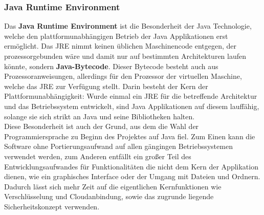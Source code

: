 \documentclass[13pt,a4paper,bibliography=totocnumbered,listof=totocnumbered]{scrartcl}
\begin{document}
\subsubsection{Java Runtime Environment}
Das \textbf{Java Runtime Environment} ist die Besonderheit der Java Technologie, welche den plattformunabhängigen Betrieb der Java Applikationen erst ermöglicht. Das  JRE nimmt keinen üblichen Maschinencode entgegen, der prozessorgebunden wäre und damit nur auf bestimmten Architekturen laufen könnte, sondern \textbf{Java-Bytecode}. Dieser Bytecode besteht auch aus Prozessoranweisungen, allerdings für den Prozessor der virtuellen Maschine, welche das JRE zur Verfügung stellt. Darin besteht der Kern der Plattformunabhängigkeit: Wurde einmal ein JRE für die betreffende Architektur und das Betriebssystem entwickelt, sind Java Applikationen auf diesem lauffähig, solange sie sich strikt an Java und seine Bibliotheken halten.\\
Diese Besonderheit ist auch der Grund, aus dem die Wahl der Programmiersprache zu Beginn des Projektes auf Java fiel. Zum Einen kann die Software ohne Portierungsaufwand auf allen gängingen Betriebssystemen verwendet werden, zum Anderen entfällt ein großer Teil des Entwicklungsaufwandes für Funktionalitäten die nicht dem Kern der Applikation dienen, wie ein graphisches Interface oder der Umgang mit Dateien und Ordnern. Dadurch lässt sich mehr Zeit auf die eigentlichen Kernfunktionen wie Verschlüsselung und Cloudanbindung,  sowie das zugrunde liegende Sicherheitskonzept verwenden. \\
\cite[S. 63f]{3}
\end{document}

